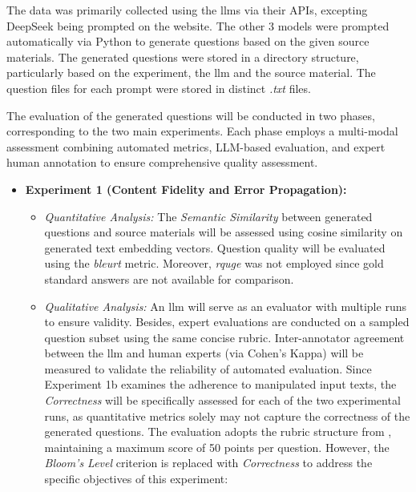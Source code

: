  The data was primarily collected using the \ac{llms} via their APIs, excepting DeepSeek being prompted on the website. The other 3 models were prompted automatically via Python to generate questions based on the given source materials. The generated questions were stored in a directory structure, particularly based on the experiment, the \ac{llm} and the source material. The question files for each prompt were stored in distinct \textit{.txt} files.

 The evaluation of the generated questions will be conducted in two phases, corresponding to the two main experiments. Each phase employs a multi-modal assessment combining automated metrics, LLM-based evaluation, and expert human annotation to ensure comprehensive quality assessment.
\begin{itemize}
    \item \textbf{Experiment 1 (Content Fidelity and Error Propagation):}
    \begin{itemize}
        \item \textit{Quantitative Analysis:} The \textit{Semantic Similarity} between generated questions and source materials will be assessed using cosine similarity on generated text embedding vectors. Question quality will be evaluated using the \textit{\ac{bleurt}} metric. Moreover, \textit{\ac{rquge}} was not employed since gold standard answers are not available for comparison.
        \vspace{1em}\pagebreak
        \item \textit{Qualitative Analysis:} An \ac{llm} will serve as an evaluator with multiple runs to ensure validity. Besides, expert evaluations are conducted on a sampled question subset using the same concise rubric. Inter-annotator agreement between the \ac{llm} and human experts (via Cohen's Kappa) will be measured to validate the reliability of automated evaluation. Since Experiment 1b examines the adherence to manipulated input texts, the \textit{Correctness} will be specifically assessed for each of the two experimental runs, as quantitative metrics solely may not capture the correctness of the generated questions. The evaluation adopts the rubric structure from \cite{mi_comparative_2024}, maintaining a maximum score of 50 points per question. However, the \textit{Bloom's Level} criterion is replaced with \textit{Correctness} to address the specific objectives of this experiment:


\end{itemize}
\end{itemize}
